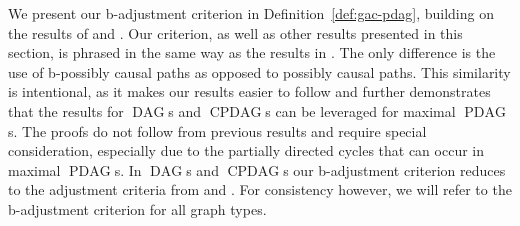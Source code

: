 \documentclass[letterpaper]{article}
\theoremstyle{definition}
\theoremstyle{remark}
\DeclareMathOperator{\PDAG}{PDAG}
\DeclareMathOperator{\CPDAG}{CPDAG}
\DeclareMathOperator{\DAG}{DAG}
\newcommand{\mpdag}{maximal $\PDAG$}
\begin{document}
We present our b-adjustment criterion in Definition~\ref{def:gac-pdag}, building on the results of \cite{shpitser2012validity,shpitser2012avalidity} and \cite{perkovic15_uai,perkovic16}. Our criterion, as well as other results presented in this section, is phrased in the same way as the results in \cite{perkovic15_uai,perkovic16}. The only difference is the use of b-possibly causal paths as opposed to possibly causal paths. This similarity is intentional, as it makes our results easier to follow and further demonstrates that the results for $\DAG$s and $\CPDAG$s can be leveraged for \mpdag{}s. The proofs do not follow from previous results and require special consideration, especially due to the partially directed cycles that can occur in \mpdag{}s. In $\DAG$s and $\CPDAG$s our b-adjustment criterion reduces to the adjustment criteria from \cite{shpitser2012validity,shpitser2012avalidity} and \cite{perkovic15_uai,perkovic16}. For consistency however, we will refer to the b-adjustment criterion for all graph types.
\end{document}

